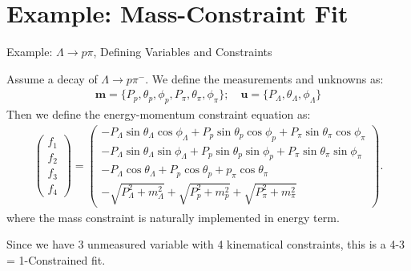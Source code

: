 \documentclass[
	xcolor=dvipsnames,
	aspectratio=169,	
	10pt, 
	]{beamer}
\begin{document}
\section{Example: Mass-Constraint Fit}
\begin{frame}{Example: $\Lambda\to p\pi$, Defining Variables and Constraints}
	\begin{block}{}
		Assume a decay of $\Lambda\to p\pi^-$. We define the measurements and unknowns as:
		\begin{align}
			\mathbf{m}=\{P_p,\theta_p,\phi_p,P_\pi,\theta_\pi,\phi_\pi\};\quad\mathbf{u} = \{P_\Lambda,\theta_\Lambda,\phi_\Lambda\}
		\end{align}
		Then we define the energy-momentum constraint equation as:
		\begin{align}
			\begin{pmatrix}
				f_1\\f_2\\f_3\\f_4
			\end{pmatrix}=
			\begin{pmatrix}
				-P_\Lambda\sin\theta_\Lambda\cos\phi_\Lambda+P_p\sin\theta_p\cos\phi_p+P_\pi\sin\theta_\pi\cos\phi_\pi\\
				-P_\Lambda\sin\theta_\Lambda\sin\phi_\Lambda+P_p\sin\theta_p\sin\phi_p+P_\pi\sin\theta_\pi\sin\phi_\pi\\
				-P_\Lambda\cos\theta_\Lambda+P_p\cos\theta_p+p_\pi\cos\theta_\pi\\
				-\sqrt{P_\Lambda^2+m_\Lambda^2}+\sqrt{P_p^2+m_p^2}+\sqrt{P_\pi^2+m_\pi^2}
			\end{pmatrix}.\label{FMat}
		\end{align}
		where the mass constraint is naturally implemented in energy term.
		
		Since we have 3 unmeasured variable with 4 kinematical constraints, this is a 4-3 = 1-Constrained fit.
	\end{block}
\end{frame}
\end{document}
